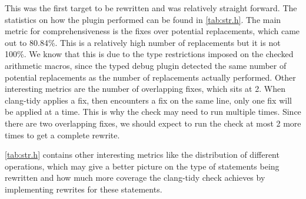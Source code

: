 This was the first target to be rewritten and was relatively straight forward. The statistics on how the plugin performed can be found in \ref{tab:str.h}. The main metric for comprehensiveness is the fixes over potential replacements, which came out to 80.84\%. This is a relatively high number of replacements but it is not 100\%. We know that this is due to the type restrictions imposed on the checked arithmetic macros, since the typed debug plugin detected the same number of potential replacements as the number of replacements actually performed. Other interesting metrics are the number of overlapping fixes, which sits at 2. When clang-tidy applies a fix, then encounters a fix on the same line, only one fix will be applied at a time. This is why the check may need to run multiple times. Since there are two overlapping fixes, we should expect to run the check at most 2 more times to get a complete rewrite.

\ref{tab:str.h} contains other interesting metrics like the distribution of different operations, which may give a better picture on the type of statements being rewritten and how much more coverage the clang-tidy check achieves by implementing rewrites for these statements.

